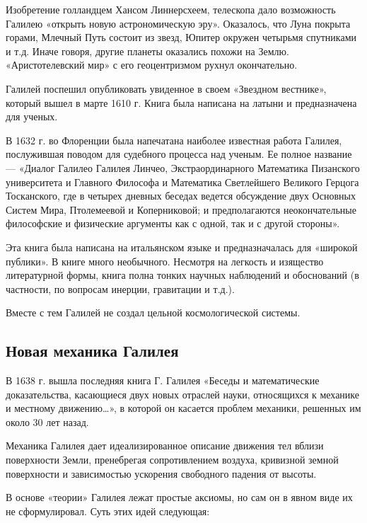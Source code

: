 \documentclass[
]{article}
\begin{document}
Изобретение голландцем Хансом Линнерсхеем, телескопа дало возможность
Галилею «открыть новую астрономическую эру». Оказалось, что Луна покрыта
горами, Млечный Путь состоит из звезд, Юпитер окружен четырьмя
спутниками и т.д. Иначе говоря, другие планеты оказались похожи на
Землю. «Аристотелевский мир» с его геоцентризмом рухнул окончательно.

Галилей поспешил опубликовать увиденное в своем «Звездном вестнике»,
который вышел в марте 1610 г. Книга была написана на латыни и
предназначена для ученых.

В 1632 г. во Флоренции была напечатана наиболее известная работа
Галилея, послужившая поводом для судебного процесса над ученым. Ее
полное название --- «Диалог Галилео Галилея Линчео, Экстраординарного
Математика Пизанского университета и Главного Философа и Математика
Светлейшего Великого Герцога Тосканского, где в четырех дневных беседах
ведется обсуждение двух Основных Систем Мира, Птолемеевой и
Коперниковой; и предполагаются неокончательные философские и физические
аргументы как с одной, так и с другой стороны».

Эта книга была написана на итальянском языке и предназначалась для
«широкой публики». В книге много необычного. Несмотря на легкость и
изящество литературной формы, книга полна тонких научных наблюдений и
обоснований (в частности, по вопросам инерции, гравитации и т.д.).

Вместе с тем Галилей не создал цельной космологической системы.

\hypertarget{ux43dux43eux432ux430ux44f-ux43cux435ux445ux430ux43dux438ux43aux430-ux433ux430ux43bux438ux43bux435ux44f}{%
\subsection{Новая механика
Галилея}\label{ux43dux43eux432ux430ux44f-ux43cux435ux445ux430ux43dux438ux43aux430-ux433ux430ux43bux438ux43bux435ux44f}}

В 1638 г. вышла последняя книга Г. Галилея «Беседы и математические
доказательства, касающиеся двух новых отраслей науки, относящихся к
механике и местному движению\ldots», в которой он касается проблем
механики, решенных им около 30 лет назад.

Механика Галилея дает идеализированное описание движения тел вблизи
поверхности Земли, пренебрегая сопротивлением воздуха, кривизной земной
поверхности и зависимостью ускорения свободного падения от высоты.

В основе «теории» Галилея лежат простые аксиомы, но сам он в явном виде
их не сформулировал. Суть этих идей следующая:
\end{document}
